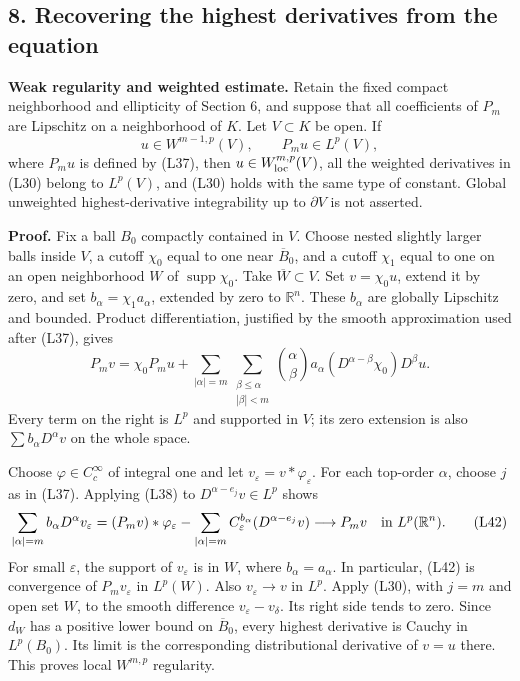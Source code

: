 \documentclass[
  11pt,
]{article}
\begin{document}
\subsection{8. Recovering the highest derivatives from the
equation}\label{recovering-the-highest-derivatives-from-the-equation}

\textbf{Weak regularity and weighted estimate.} Retain the fixed compact
neighborhood and ellipticity of Section 6, and suppose that all
coefficients of \(P_m\) are Lipschitz on a neighborhood of \(K\). Let
\(V\subset K\) be open. If \[
u\in W^{m-1,p}(V),\qquad P_mu\in L^p(V),                           \tag{L40}
\] where \(P_mu\) is defined by (L37), then
\(u\in W^{m,p}_{\rm loc}(V)\), all the weighted derivatives in (L30)
belong to \(L^p(V)\), and (L30) holds with the same type of constant.
Global unweighted highest-derivative integrability up to \(\partial V\)
is not asserted.

\textbf{Proof.} Fix a ball \(B_0\) compactly contained in \(V\). Choose
nested slightly larger balls inside \(V\), a cutoff \(\chi_0\) equal to
one near \(\overline B_0\), and a cutoff \(\chi_1\) equal to one on an
open neighborhood \(W\) of \(\operatorname{supp}\chi_0\). Take
\(\overline W\subset V\). Set \(v=\chi_0u\), extend it by zero, and set
\(b_\alpha=\chi_1a_\alpha\), extended by zero to \(\mathbb R^n\). These
\(b_\alpha\) are globally Lipschitz and bounded. Product
differentiation, justified by the smooth approximation used after (L37),
gives \[
P_mv=\chi_0P_mu+
\sum_{|\alpha|=m}\sum_{\substack{\beta\leq\alpha\\|\beta|<m}}
 \binom{\alpha}{\beta}a_\alpha(D^{\alpha-\beta}\chi_0)D^\beta u.
                                                                    \tag{L41}
\] Every term on the right is \(L^p\) and supported in \(V\); its zero
extension is also \(\sum b_\alpha D^\alpha v\) on the whole space.

Choose \(\varphi\in C_c^\infty\) of integral one and let
\(v_\varepsilon=v*\varphi_\varepsilon\). For each top-order \(\alpha\),
choose \(j\) as in (L37). Applying (L38) to \(D^{\alpha-e_j}v\in L^p\)
shows \[
\sum_{|\alpha|=m} b_\alpha D^\alpha v_\varepsilon
=(P_mv)*\varphi_\varepsilon
 -\sum_{|\alpha|=m}C_\varepsilon^{b_\alpha}(D^{\alpha-e_j}v)
\longrightarrow P_mv\quad\hbox{in }L^p(\mathbb R^n).              \tag{L42}
\] For small \(\varepsilon\), the support of \(v_\varepsilon\) is in
\(W\), where \(b_\alpha=a_\alpha\). In particular, (L42) is convergence
of \(P_mv_\varepsilon\) in \(L^p(W)\). Also \(v_\varepsilon\to v\) in
\(L^p\). Apply (L30), with \(j=m\) and open set \(W\), to the smooth
difference \(v_\varepsilon-v_\delta\). Its right side tends to zero.
Since \(d_W\) has a positive lower bound on \(\overline B_0\), every
highest derivative is Cauchy in \(L^p(B_0)\). Its limit is the
corresponding distributional derivative of \(v=u\) there. This proves
local \(W^{m,p}\) regularity.
\end{document}
